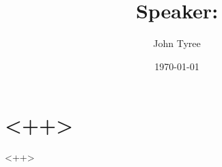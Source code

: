 \documentclass[a4paper,10pt]{article}
\title{Speaker: }<++>
\author{John Tyree}
\date{\today}
\begin{document}
\maketitle
\section*{<++>}
<++>
\end{document}
